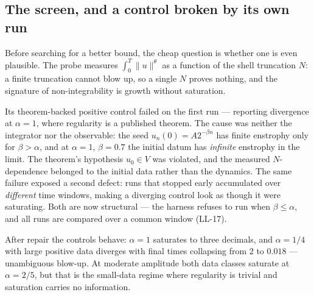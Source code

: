 \documentclass[11pt,a4paper]{article}
\theoremstyle{definition}
\theoremstyle{plain}
\begin{document}
\subsection{The screen, and a control broken by its own run}

Before searching for a better bound, the cheap question is whether one is even plausible. The
probe measures $\int_0^T\|u\|^\theta$ as a function of the shell truncation $N$: a finite
truncation cannot blow up, so a single $N$ proves nothing, and the signature of
non-integrability is growth without saturation.

Its theorem-backed positive control failed on the first run --- reporting divergence at
$\alpha=1$, where regularity is a published theorem. The cause was neither the integrator nor
the observable: the seed $u_n(0)=A2^{-\beta n}$ has finite enstrophy only for $\beta>\alpha$,
and at $\alpha=1$, $\beta=0.7$ the initial datum has \emph{infinite} enstrophy in the limit.
The theorem's hypothesis $u_0\in V$ was violated, and the measured $N$-dependence belonged to
the initial data rather than the dynamics. The same failure exposed a second defect: runs that
stopped early accumulated over \emph{different} time windows, making a diverging control look
as though it were saturating. Both are now structural --- the harness refuses to run when
$\beta\le\alpha$, and all runs are compared over a common window (LL-17).

After repair the controls behave: $\alpha=1$ saturates to three decimals, and $\alpha=1/4$ with
large positive data diverges with final times collapsing from $2$ to $0.018$ --- unambiguous
blow-up. At moderate amplitude both data classes saturate at $\alpha=2/5$, but that is the
small-data regime where regularity is trivial and saturation carries no information.
\end{document}
